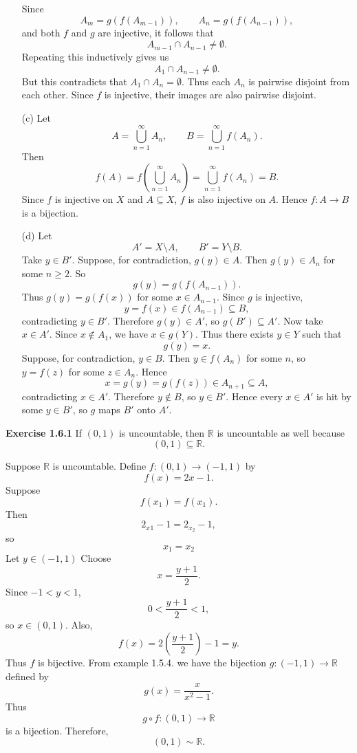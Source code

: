 \documentclass[12pt]{article}
\begin{document}
\begin{enumerate}
          Since
          \[
              A_m=g(f(A_{m-1})), \qquad  A_n=g(f(A_{n-1})),
          \]
          and both $f$ and $g$ are injective, it follows that
          \[
              A_{m-1}\cap A_{n-1} \neq \emptyset.
          \]
          Repeating this inductively gives us
          \[
              A_1 \cap A_{n-1} \neq \emptyset.
          \]
          But this contradicts that $A_1 \cap A_n = \emptyset$.
          Thus each $A_n$ is pairwise disjoint from each other.
          Since $f$ is injective, their images are also pairwise disjoint.
    \item [(c)] Let
          \[
              A=\bigcup_{n=1}^\infty A_n,
              \qquad
              B=\bigcup_{n=1}^\infty f(A_n).
          \]
          Then
          \[
              f(A)=
              f\left(\bigcup_{n=1}^\infty A_n\right)
              =
              \bigcup_{n=1}^\infty f(A_n)
              =
              B.
          \]
          Since $f$ is injective on $X$ and $A \subseteq X$, $f$ is also injective on $A$.
          Hence $f: A \to B$ is a bijection.
    \item [(d)]
          Let
          \[
              A'=X\setminus A,\qquad B'=Y\setminus B.
          \]
          Take $y \in B'$. Suppose, for contradiction, $g(y) \in A$. Then
          $g(y) \in A_n$ for some $n \geq 2$. So
          \[
              g(y)= g(f(A_{n-1})).
          \]
          Thus \(g(y)=g(f(x))\) for some \(x\in A_{n-1}\). Since \(g\) is injective,
          \[
              y=f(x)\in f(A_{n-1})\subseteq B,
          \]
          contradicting \(y\in B'\). Therefore \(g(y)\in A'\), so \(g(B')\subseteq A'\).
          Now take \(x\in A'\). Since \(x\notin A_1\), we have \(x\in g(Y)\).
          Thus there exists \(y\in Y\) such that
          \[
              g(y)=x.
          \]
          Suppose, for contradiction, \(y\in B\).
          Then \(y\in f(A_n)\) for some \(n\), so \(y=f(z)\) for some \(z\in A_n\).
          Hence
          \[
              x=g(y)=g(f(z))\in A_{n+1}\subseteq A,
          \]contradicting \(x\in A'\). Therefore \(y\notin B\), so \(y\in B'\).
          Hence every \(x\in A'\) is hit by some \(y\in B'\), so \(g\) maps \(B'\) onto \(A'\).

\end{enumerate}

\noindent{} \textbf{Exercise 1.6.1}
If $(0,1)$ is uncountable, then $\mathbb{R}$ is uncountable as well because
\[
    (0,1) \subseteq \mathbb{R}.
\]

Suppose $\mathbb{R}$ is uncountable.
Define $f: (0,1) \to (-1,1)$ by
\[
    f(x) = 2x - 1.
\]
Suppose
\[f(x_1) = f(x_1).\]
Then
\[
    2_x{_1} - 1 = 2_{x_2} - 1, \]
so
\[
    x_1 = x_2 \]
Let $y \in (-1, 1)$ Choose
\[
    x=\frac{y+1}{2}.
\]
Since \(-1<y<1\),
\[
    0<\frac{y+1}{2}<1,
\]
so \(x\in(0,1)\).
Also,
\[
    f(x)=2\left(\frac{y+1}{2}\right)-1=y.
\]
Thus \(f\) is bijective.
From example 1.5.4. we have the bijection $g: (-1,1) \to \mathbb{R}$ defined by
\[
    g(x) = \frac{x}{x^2-1}.
\]
Thus \[
    g\circ f:(0,1)\to\mathbb R
\]
is a bijection.
Therefore,
\[
    (0,1) \sim \mathbb{R}.
\]
\end{document}
